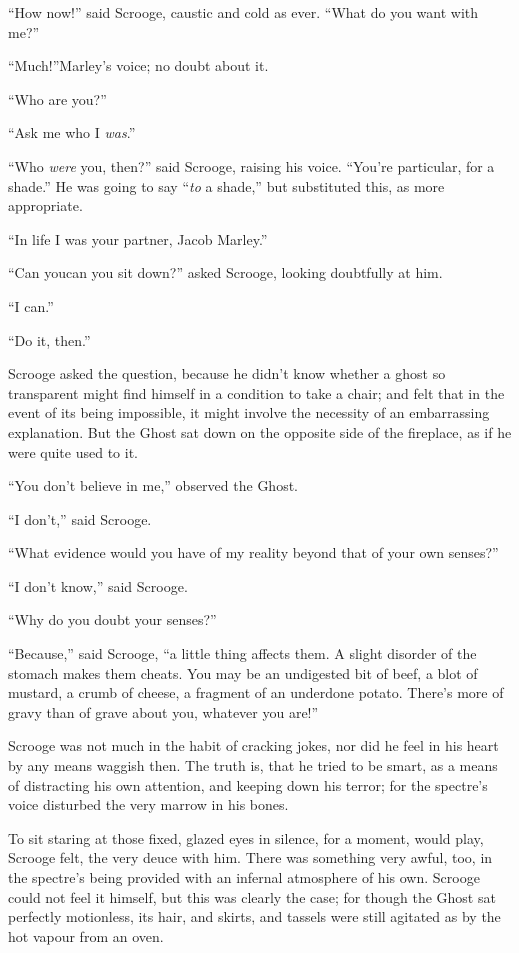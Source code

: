 \documentclass[paper=5.5in:8.5in,BCOR=10mm,twoside,DIV=15,12pt,usegeometry,openany]{scrbook} %
\begin{document}
\enquote{How now!} said Scrooge, caustic and cold as ever. \enquote{What do you want with me?}

\enquote{Much!}\textemdash Marley's voice; no doubt about it.

\enquote{Who are you?}

\enquote{Ask me who I \textit{was}.}

\enquote{Who \textit{were} you, then?} said Scrooge, raising his voice. \enquote{You're particular, for a shade.} He was going to say \enquote{\textit{to} a shade,} but substituted this, as more appropriate.

\enquote{In life I was your partner, Jacob Marley.}

\enquote{Can you\textemdash can you sit down?} asked Scrooge, looking doubtfully at him.

\enquote{I can.}

\enquote{Do it, then.}

Scrooge asked the question, because he didn't know whether a ghost so transparent might find himself in a condition to take a chair; and felt that in the event of its being impossible, it might involve the necessity of an embarrassing explanation. But the Ghost sat down on the opposite side of the fireplace, as if he were quite used to it.

\enquote{You don't believe in me,} observed the Ghost.

\enquote{I don't,} said Scrooge.

\enquote{What evidence would you have of my reality beyond that of your own senses?}

\enquote{I don't know,} said Scrooge.

\enquote{Why do you doubt your senses?}

\enquote{Because,} said Scrooge, \enquote{a little thing affects them. A slight disorder of the stomach makes them cheats. You may be an undigested bit of beef, a blot of mustard, a crumb of cheese, a fragment of an underdone potato. There's more of gravy than of grave about you, whatever you are!}

Scrooge was not much in the habit of cracking jokes, nor did he feel in his heart by any means waggish then. The truth is, that he tried to be smart, as a means of distracting his own attention, and keeping down his terror; for the spectre's voice disturbed the very marrow in his bones.

To sit staring at those fixed, glazed eyes in silence, for a moment, would play, Scrooge felt, the very deuce with him. There was something very awful, too, in the spectre's being provided with an infernal atmosphere of his own. Scrooge could not feel it himself, but this was clearly the case; for though the Ghost sat perfectly motionless, its hair, and skirts, and tassels were still agitated as by the hot vapour from an oven.
\end{document}
